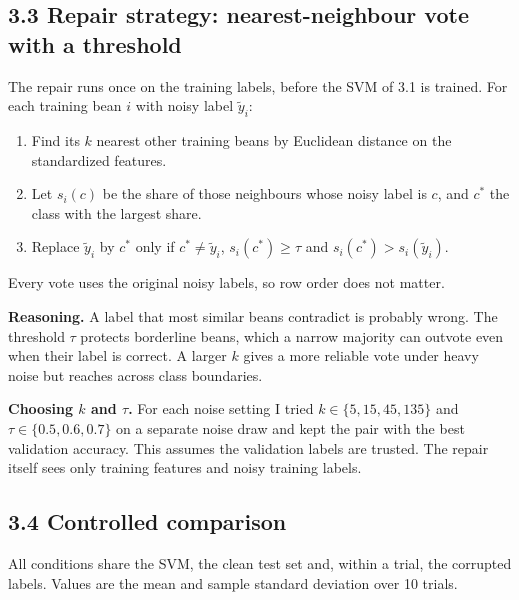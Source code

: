 \documentclass[11pt]{article}
\begin{document}
\subsection*{3.3 Repair strategy: nearest-neighbour vote with a threshold}

The repair runs once on the training labels, before the SVM of 3.1 is trained. For each
training bean $i$ with noisy label $\tilde y_i$:
\vspace{-0.6em}
\begin{enumerate}\setlength{\itemsep}{0pt}\setlength{\parskip}{0pt}
\item Find its $k$ nearest other training beans by Euclidean distance on the
  standardized features.
\item Let $s_i(c)$ be the share of those neighbours whose noisy label is $c$, and
  $c^\ast$ the class with the largest share.
\item Replace $\tilde y_i$ by $c^\ast$ only if $c^\ast\neq\tilde y_i$,
  $s_i(c^\ast)\ge\tau$ and $s_i(c^\ast)>s_i(\tilde y_i)$.
\end{enumerate}
\vspace{-0.6em}
Every vote uses the original noisy labels, so row order does not matter.

\textbf{Reasoning.} A label that most similar beans contradict is probably wrong. The
threshold $\tau$ protects borderline beans, which a narrow majority can outvote even when
their label is correct. A larger $k$ gives a more reliable vote under heavy noise but
reaches across class boundaries.

\textbf{Choosing $k$ and $\tau$.} For each noise setting I tried $k\in\{5,15,45,135\}$
and $\tau\in\{0.5,0.6,0.7\}$ on a separate noise draw and kept the pair with the best
validation accuracy. This assumes the validation labels are trusted. The repair itself
sees only training features and noisy training labels.

\subsection*{3.4 Controlled comparison}

All conditions share the SVM, the clean test set and, within a trial, the corrupted
labels. Values are the mean and sample standard deviation over 10 trials.
\end{document}
